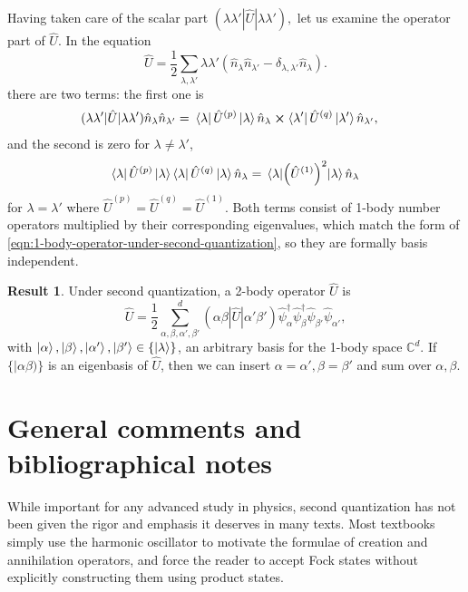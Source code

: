 \documentclass{article}
\theoremstyle{definition}
\newtheorem{res}[mot]{Result}
\numberwithin{equation}{section}
\begin{document}
Having taken care of the scalar part
$
    (\lambda \lambda'
    |\hat{U}|
    \lambda \lambda'),
$ 
let us examine the operator part of $\hat{U}$. In the equation
\[
    \hat{U}=
    \frac{1}{2}
    \sum_{\lambda,\lambda'}
    \lambda \lambda'
    \left( \hat{n}_{\lambda}\hat{n}_{\lambda'}
    -
    \delta_{\lambda,\lambda'}
    \hat{n}_{\lambda} \right) .
\]
there are two terms: the first one is 
\begin{align*}
    (\lambda \lambda'
    |\hat{U}|
    \lambda \lambda')
    \hat{n}_{\lambda} \hat{n}_{\lambda'}
    =&\ 
    \bra{\lambda} \hat{U}^{(p)} \ket{\lambda}
    \hat{n}_{\lambda}
    \cross 
    \bra{\lambda'} \hat{U}^{(q)} \ket{\lambda'}
    \hat{n}_{\lambda'},
\end{align*}
and the second is zero for $\lambda \neq \lambda'$, 
\[
    \bra{\lambda} \hat{U}^{(p)} \ket{\lambda}
    \bra{\lambda} \hat{U}^{(q)} \ket{\lambda}
    \hat{n}_{\lambda}
    =
    \expval{\left( \hat{U}^{(1)} \right)^{2}}{\lambda}
    \hat{n}_{\lambda}
\]
for $\lambda = \lambda'$ where 
$\hat{U}^{(p)}=\hat{U}^{(q)}=\hat{U}^{(1)}$. 
Both terms consist of 
1-body number operators multiplied by 
their corresponding eigenvalues, which 
match the form of 
\cref{eqn:1-body-operator-under-second-quantization}, 
so they are formally basis independent. 

\begin{graybox}
    \begin{res}
        Under second quantization, 
        a 2-body operator $\hat{U}$ is 
        \begin{equation}
            \hat{U}
            =
            \frac{1}{2}
            \sum_{\alpha,\beta,\alpha',\beta'}^{d}
            (\alpha \beta
            |\hat{U}|
            \alpha' \beta')
            \hat{\psi}^{\dagger}_{\alpha}
            \hat{\psi}^{\dagger}_{\beta}
            \hat{\psi}_{\beta'}
            \hat{\psi}_{\alpha'},
        \end{equation}
        with 
        $\ket{\alpha},\ket{\beta}, 
        \ket{\alpha'}, \ket{\beta'}
        \in \{\ket{\lambda}\}$, 
        an arbitrary basis 
        for the 1-body space $\mathbb{C}^{d}$. 
        If 
        $\{|\alpha \beta)\}$ 
        is an eigenbasis of $\hat{U}$, then 
        we can insert 
        $\alpha = \alpha', \beta = \beta'$ 
        and sum over $\alpha, \beta$.
    \end{res}
\end{graybox}

\section{General comments and bibliographical notes}
While important for any advanced study in physics, 
second quantization has not been given the rigor and 
emphasis it deserves in many texts. Most textbooks simply 
use the harmonic oscillator to motivate the formulae of 
creation and annihilation operators, and force the reader 
to accept Fock states without explicitly constructing them 
using product states.
\end{document}

